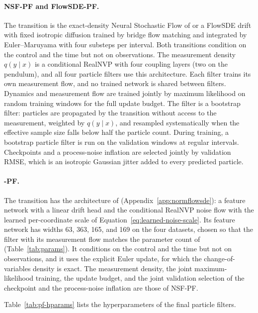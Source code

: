 \paragraph{NSF-PF and FlowSDE-PF.}
The transition is the exact-density Neural Stochastic Flow of \citet{kiyohara2025nsf} or a FlowSDE drift \citep{lou2026flowsde} with fixed isotropic diffusion trained by bridge flow matching and integrated by Euler--Maruyama with four substeps per interval. Both transitions condition on the control and the time but not on observations. The measurement density $q(y\mid x)$ is a conditional RealNVP with four coupling layers (two on the pendulum), and all four particle filters use this architecture. Each filter trains its own measurement flow, and no trained network is shared between filters. Dynamics and measurement flow are trained jointly by maximum likelihood on random training windows for the full update budget. The filter is a bootstrap filter: particles are propagated by the transition without access to the measurement, weighted by $q(y\mid x)$, and resampled systematically when the effective sample size falls below half the particle count. During training, a bootstrap particle filter is run on the validation windows at regular intervals. Checkpoints and a process-noise inflation are selected jointly by validation RMSE, which is an isotropic Gaussian jitter added to every predicted particle.

\paragraph{\method-PF.}\label{app:normflowsde-pf}
The transition has the architecture of \method (Appendix~\ref{app:normflowsde}): a feature network with a linear drift head and the conditional RealNVP noise flow with the learned per-coordinate scale of Equation~\eqref{eq:learned-noise-scale}. Its feature network has widths 63, 363, 165, and 169 on the four datasets, chosen so that the filter with its measurement flow matches the parameter count of \method (Table~\ref{tab:params}). It conditions on the control and the time but not on observations, and it uses the explicit Euler update, for which the change-of-variables density is exact. The measurement density, the joint maximum-likelihood training, the update budget, and the joint validation selection of the checkpoint and the process-noise inflation are those of NSF-PF.

Table~\ref{tab:pf-hparams} lists the hyperparameters of the final particle filters.

